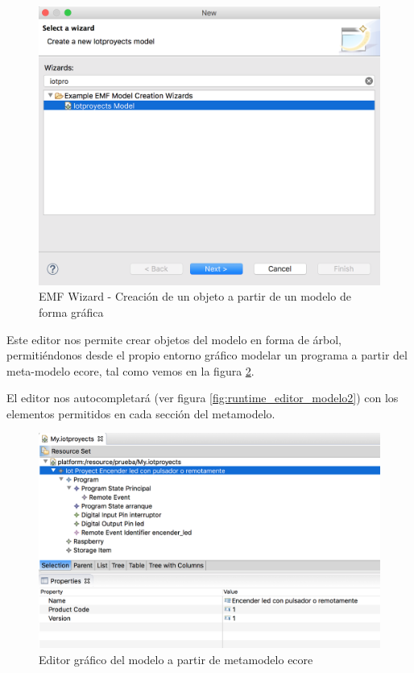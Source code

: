 \begin{figure}
	\centering
    \includegraphics[scale=0.4]{images/emf_capturas/runtime_editor_wizard}
    \sourcepropia{}
    \caption{EMF Wizard - Creación de un objeto a partir de un modelo de forma gráfica}
    \label{fig:runtime_editor_wizard}
\end{figure}

Este editor nos permite crear objetos del modelo en forma de árbol, permitiéndonos desde el propio entorno gráfico modelar un programa a partir del meta-modelo \gls{ecore}, tal como vemos en la figura \ref{fig:runtime_editor_modelo1}.

El editor nos autocompletará (ver figura \ref{fig:runtime_editor_modelo2}) con los elementos permitidos en cada sección del metamodelo.

\begin{figure}
	\centering
    \includegraphics[scale=0.4]{images/emf_capturas/runtime_editor_modelo1}
    \sourcepropia{}
    \caption{Editor gráfico del modelo a partir de metamodelo ecore}
    \label{fig:runtime_editor_modelo1}
\end{figure}

